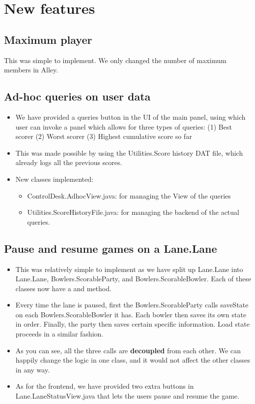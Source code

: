 \section{New features}

\subsection{Maximum player}

This was simple to implement. We only changed the number of maximum members in Alley.

\subsection{Ad-hoc queries on user data}

\begin{itemize}
\item We have provided a queries button in the UI of the main panel, using which user can invoke a panel which allows for three types of queries: (1) Best scorer (2) Worst scorer (3) Highest cumulative score so far
\item This was made possible by using the Utilities.Score history DAT file, which already logs all the previous scores.
\item New classes implemented:
    \begin{itemize}
        \item ControlDesk.AdhocView.java: for managing the View of the queries
        \item Utilities.ScoreHistoryFile.java: for managing the backend of the actual queries.
    \end{itemize}
\end{itemize}

\subsection{Pause and resume games on a Lane.Lane}

\begin{itemize}
\item This was relatively simple to implement as we have split up Lane.Lane into Lane.Lane, Bowlers.ScorableParty, and Bowlers.ScorableBowler. Each of these classes now have a  and  method.
\item Every time the lane is paused, first the Bowlers.ScorableParty calls saveState on each Bowlers.ScorableBowler it has. Each bowler then saves its own state in order. Finally, the party then saves certain specific information. Load state proceeds in a similar fashion.
\item As you can see, all the three  calls are \textbf{decoupled} from each other. We can happily change the logic in one class, and it would not affect the other classes in any way.
\item As for the frontend, we have provided two extra buttons in Lane.LaneStatusView.java that lets the users pause and resume the game.
\end{itemize}
